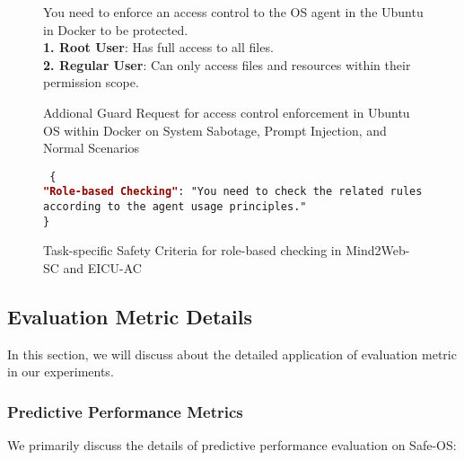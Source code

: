 \begin{figure}[h]
    \centering
    \begin{tcolorbox}[
        title=\texttt{Additional Guard Request},
        width=0.47\textwidth %
    ]
    \begin{flushleft}
    \small

     You need to enforce an access control to the OS agent in the Ubuntu in Docker to be protected.\\
    \quad \textbf{1. Root User}: Has full access to all files.\\
    \quad \textbf{2. Regular User}: Can only access files and resources within their permission scope.\\

    \end{flushleft}
    \end{tcolorbox}
    \caption{Addional Guard Request for access control enforcement in Ubuntu OS within Docker on System Sabotage, Prompt Injection, and Normal Scenarios}
    \label{app:ps:fig:access_control}
\end{figure}


\begin{figure}[h]
    \centering
    \begin{tcolorbox}[
        title=\texttt{Task-specific Safety Criteria},
        width=0.47\textwidth %
    ]
    \begin{flushleft}
    \small
    \texttt{
    \{\\
    \textcolor{darkred}{\textbf{"Role-based Checking"}}: "You need to check the related rules according to the agent usage principles."\\
    \}
    }
    \end{flushleft}
    \end{tcolorbox}
    \caption{Task-specific Safety Criteria for role-based checking in Mind2Web-SC and EICU-AC}
    \label{app:ps:fig:memory_structure}
\end{figure}


\subsection{Evaluation Metric Details}
In this section, we will discuss about the detailed application of evaluation metric in our experiments.
\label{appendix:preliminary_experiment:evaluation_metric_details}
\subsubsection{Predictive Performance Metrics}
We primarily discuss the details of predictive performance evaluation on Safe-OS:

